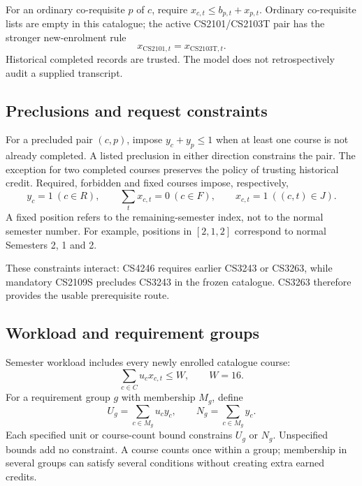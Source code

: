 \documentclass[11pt,a4paper]{article}
\begin{document}
For an ordinary co-requisite $p$ of $c$, require
$x_{c,t}\leq b_{p,t}+x_{p,t}$. Ordinary co-requisite lists are empty in this
catalogue; the active CS2101/CS2103T pair
has the stronger new-enrolment rule
\[
 x_{\mathrm{CS2101},t}=x_{\mathrm{CS2103T},t}.
\]
Historical completed records are trusted. The model does not retrospectively
audit a supplied transcript.

\subsection{Preclusions and request constraints}
For a precluded pair $(c,p)$, impose $y_c+y_p\leq1$ when at least one course
is not already completed. A listed preclusion in either direction constrains
the pair. The exception for two completed courses preserves the policy of
trusting historical credit.
Required, forbidden and fixed courses impose, respectively,
\[
 y_c=1\ (c\in R),\qquad
 \sum_t x_{c,t}=0\ (c\in F),\qquad
 x_{c,t}=1\ ((c,t)\in J).
\]
A fixed position refers to the remaining-semester index, not to the normal
semester number. For example, positions in $[2,1,2]$ correspond to normal
Semesters 2, 1 and 2.

These constraints interact: CS4246 requires earlier CS3243 or CS3263, while
mandatory CS2109S precludes CS3243 in the frozen catalogue. CS3263 therefore
provides the usable prerequisite route.

\par
\subsection{Workload and requirement groups}
Semester workload includes every newly enrolled catalogue course:
\[
 \sum_{c\in C}u_c x_{c,t}\leq W,\qquad W=16 .
\]
For a requirement group $g$ with membership $M_g$, define
\[
 U_g=\sum_{c\in M_g}u_c y_c,\qquad N_g=\sum_{c\in M_g}y_c .
\]
Each specified unit or course-count bound constrains $U_g$ or $N_g$.
Unspecified bounds add no constraint. A course counts once within a group;
membership in several groups can satisfy several conditions without creating
extra earned credits.
\end{document}
